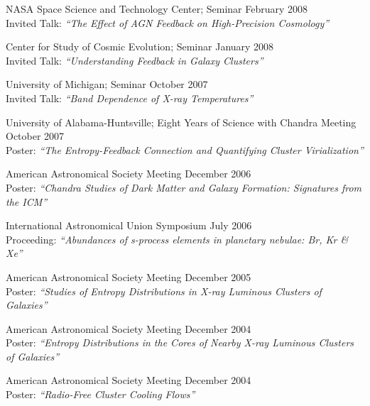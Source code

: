 \documentclass[12pt]{cv}
\begin{document}
NASA Space Science and Technology Center; Seminar \hfill February 2008\\
Invited Talk: {\textit{``The Effect of AGN Feedback on High-Precision Cosmology''}}

Center for Study of Cosmic Evolution; Seminar \hfill January 2008\\
Invited Talk: {\textit{``Understanding Feedback in Galaxy Clusters''}}

University of Michigan; Seminar \hfill October 2007\\
Invited Talk: {\textit{``Band Dependence of X-ray Temperatures''}}

University of Alabama-Huntsville; Eight Years of Science with Chandra Meeting \hfill October 2007\\
Poster: {\textit{``The Entropy-Feedback Connection and Quantifying Cluster Virialization''}}

American Astronomical Society Meeting \hfill December 2006\\
Poster: {\textit{``Chandra Studies of Dark Matter and Galaxy Formation: Signatures from the ICM''}}

International Astronomical Union Symposium \hfill July 2006\\
Proceeding: {\textit{``Abundances of s-process elements in planetary nebulae: Br, Kr \& Xe''}}

American Astronomical Society Meeting \hfill December 2005\\
Poster: {\textit{``Studies of Entropy Distributions in X-ray Luminous Clusters of Galaxies''}}

American Astronomical Society Meeting \hfill December 2004\\
Poster: {\textit{``Entropy Distributions in the Cores of Nearby X-ray Luminous Clusters of Galaxies''}}

American Astronomical Society Meeting \hfill December 2004\\
Poster: {\textit{``Radio-Free Cluster Cooling Flows''}}
\end{document}
